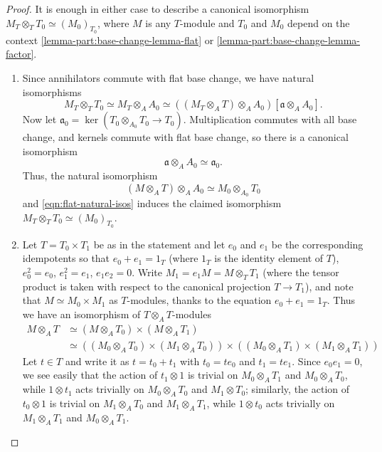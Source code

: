 \documentclass[10pt, twoside]{amsart}
\theoremstyle{plain}
\theoremstyle{definition}
\theoremstyle{remark}
\numberwithin{equation}{subsection}
\def\ga{\mathfrak a}
\begin{document}
\begin{proof}
It is enough in either case to describe a canonical isomorphism $M_T\otimes_T T_0 \simeq (M_0)_{T_0}$, where $M$ is any $T$-module and $T_0$ and $M_0$ depend on the context \ref{lemma-part:base-change-lemma-flat} or \ref{lemma-part:base-change-lemma-factor}.
\begin{enumerate}[label=(\alph*)]
\item Since annihilators commute with flat { base} change, we have natural isomorphisms
\begin{equation}\label{eqn:flat-natural-isos}
M_T\otimes_T T_0 \simeq M_T\otimes_A A_0 \simeq \left((M_T\otimes_A T) \otimes_A A_0\right)[\ga \otimes_A A_0].
\end{equation}
Now let $\ga_0 = \ker(T_0\otimes_{A_0} T_0 \rightarrow T_0)$. Multiplication commutes with all base change, and kernels commute with flat base change, so there is a canonical isomorphism
\begin{equation*}
\ga \otimes_A A_0 \simeq \ga_0.
\end{equation*}
Thus, the natural isomorphism 
\begin{equation*}
(M\otimes_A T) \otimes_A A_0 \simeq M_0\otimes_{A_0} T_0
\end{equation*}
and \eqref{eqn:flat-natural-isos} induces the claimed isomorphism $M_T\otimes_T T_0 \simeq (M_0)_{T_0}$.
\item 
{ Let $T = T_0 \times T_1$ be as in the statement and let $e_0$ and $e_1$ be the corresponding idempotents so that $e_0+e_1=1_T$ (where $1_T$ is the identity element of $T$), $e_0^2=e_0$, $e_1^2=e_1$, $e_1e_2=0$. 
Write $M_1 = e_1M= M\otimes_T T_1$ (where the tensor product is taken with respect to the canonical projection $T\rightarrow T_1$), and note that $M \simeq M_0 \times M_1$ as $T$-modules, thanks to the equation $e_0+e_1=1_T$. Thus we have an isomorphism of $T\otimes_AT$-modules 
\begin{equation}\label{eqn:base-change-sum}
\begin{split} M\otimes_A T &\simeq ( M \otimes_A T_0)\times (M\otimes_A T_1)\\
&\simeq 
\left(( M_0 \otimes_A T_0)\times (M_1\otimes_A T_0)\right)\times \left((M_0\otimes_A T_1)\times (M_1\otimes_AT_1)\right)
\end{split}
\end{equation}
Let $t\in T$ and write it as $t=t_0+t_1$ with $t_0=te_0$ and $t_1=te_1$. 
Since $e_0e_1=0$, we see easily that the action of $t_1\otimes 1$ is trivial on $M_0\otimes_A T_1$ and $M_0\otimes_AT_0$, while $1\otimes t_1$ acts trivially on $M_0\otimes_AT_0$ and $M_1\otimes T_0$; similarly, the action of $t_0\otimes 1$ is trivial on $M_1\otimes_AT_0$ and $M_1\otimes_AT_1$, while $1\otimes t_0$ acts trivially on $M_1\otimes_AT_1$ and $M_0\otimes_AT_1$.   
}
\end{enumerate}
\end{proof}
\end{document}
